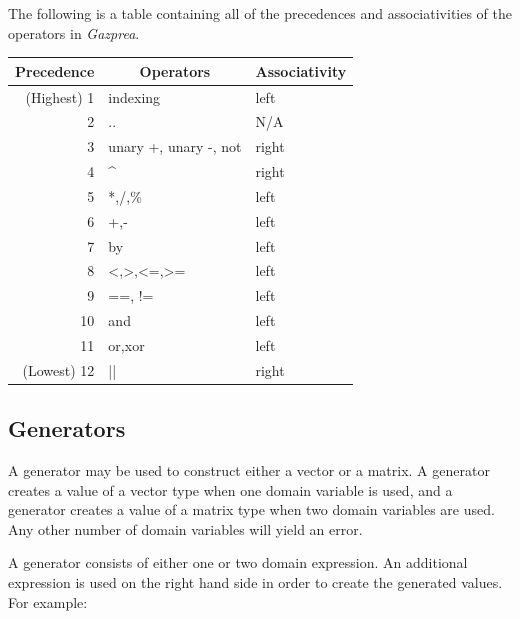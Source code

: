 \documentclass{article}
\begin{document}
    The following is a table containing all of the precedences and associativities of the operators in
    \textit{Gazprea}.

    \begin{center}
      \begin{tabular}{|r|l|l|}
        \hline
        \textbf{Precedence} &
        \multicolumn{1}{c}{\textbf{Operators}} &
        \textbf{Associativity} \\
        \hline
        (Highest) 1 & indexing              & left  \\
        2           & ..                    & N/A   \\
        3           & unary +, unary -, not & right \\
        4           & \textasciicircum      & right \\
        5           & *,/,\%                & left  \\
        6           & +,-                   & left  \\
        7           & by                    & left  \\
        8           & <,>,<=,>=             & left  \\
        9           & ==, !=                & left  \\
        10          & and                   & left  \\
        11          & or,xor                & left  \\
        (Lowest) 12 & ||                    & right \\
        \hline
      \end{tabular}
    \end{center}

  \subsection{Generators}\label{sec:generators}

    A generator may be used to construct either a vector or a matrix. A generator creates a value of a vector type
    when one domain variable is used, and a generator creates a value of a matrix type when two domain variables are
    used.  Any other number of domain variables will yield an error.

    A generator consists of either one or two domain expression. An additional expression is used on the right hand
    side in order to create the generated values. For example:
\end{document}
